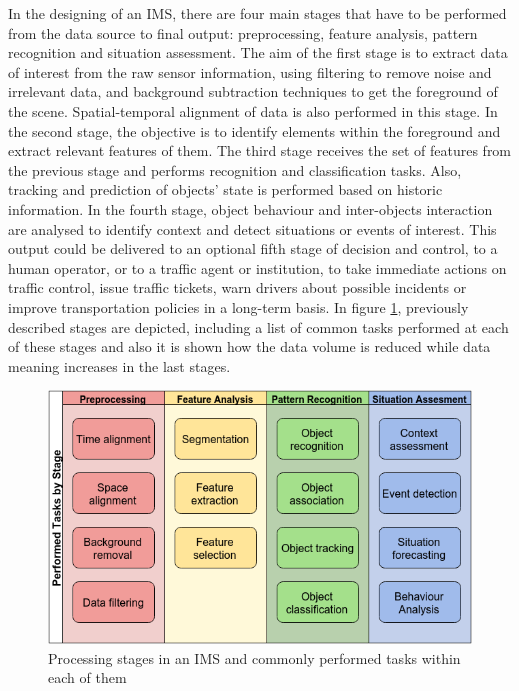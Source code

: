 
In the designing of an IMS, there are four main stages that have to be performed from the data source to final output: preprocessing, feature analysis, pattern recognition and situation assessment. The aim of the first stage is to extract data of interest from the raw sensor information, using filtering to remove noise and irrelevant data, and background subtraction techniques to get the foreground of the scene. Spatial-temporal alignment of data is also performed in this stage. In the second stage, the objective is to identify elements within the foreground and extract relevant features of them. The third stage receives the set of features from the previous stage and performs recognition and classification tasks. Also, tracking and prediction of objects' state is performed based on historic information. In the fourth stage, object behaviour and inter-objects interaction are analysed to identify context and detect situations or events of interest. This output could be delivered to an optional fifth stage of decision and control, to a human operator, or to a traffic agent or institution, to take immediate actions on traffic control, issue traffic tickets, warn drivers about possible incidents or improve transportation policies in a long-term basis. In figure \ref{proc_stages}, previously described stages are depicted, including a list of common tasks performed at each of these stages and also it is shown how the data volume is reduced while data meaning increases in the last stages. 

\begin{figure}[ht!]
\centering
\includegraphics[scale=0.55]{fig/3/processing_stages_and_tasks.png}
\caption{Processing stages in an IMS and commonly performed tasks within each of them}
\label{proc_stages}
\end{figure}


